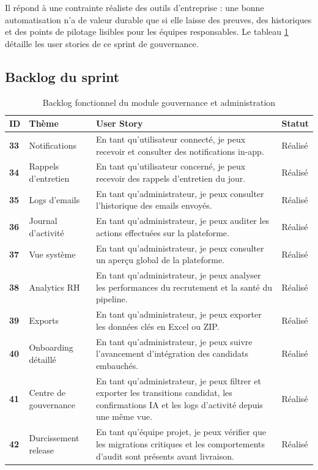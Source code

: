 Il répond à une contrainte réaliste des outils d'entreprise : une bonne automatisation n'a de valeur durable que si elle laisse des preuves, des historiques et des points de pilotage lisibles pour les équipes responsables.
Le tableau \ref{tab:governance-backlog} détaille les user stories de ce sprint de gouvernance.

\subsection{Backlog du sprint}
\begin{table}[H]
  \centering
  \caption{\label{tab:governance-backlog}Backlog fonctionnel du module gouvernance et administration}
  \begin{tabularx}{\textwidth}{>{\bfseries}p{1.3cm}p{3cm}X>{\raggedright\arraybackslash}p{2cm}}
    \toprule
    ID & Thème & User Story & Statut \\
    \midrule
    33 & Notifications & En tant qu'utilisateur connecté, je peux recevoir et consulter des notifications in-app. & Réalisé \\
    34 & Rappels d'entretien & En tant qu'utilisateur concerné, je peux recevoir des rappels d'entretien du jour. & Réalisé \\
    35 & Logs d'emails & En tant qu'administrateur, je peux consulter l'historique des emails envoyés. & Réalisé \\
    36 & Journal d'activité & En tant qu'administrateur, je peux auditer les actions effectuées sur la plateforme. & Réalisé \\
    37 & Vue système & En tant qu'administrateur, je peux consulter un aperçu global de la plateforme. & Réalisé \\
    38 & Analytics RH & En tant qu'administrateur, je peux analyser les performances du recrutement et la santé du pipeline. & Réalisé \\
    39 & Exports & En tant qu'administrateur, je peux exporter les données clés en Excel ou ZIP. & Réalisé \\
    40 & Onboarding détaillé & En tant qu'administrateur, je peux suivre l'avancement d'intégration des candidats embauchés. & Réalisé \\
    41 & Centre de gouvernance & En tant qu'administrateur, je peux filtrer et exporter les transitions candidat, les confirmations IA et les logs d'activité depuis une même vue. & Réalisé \\
    42 & Durcissement release & En tant qu'équipe projet, je peux vérifier que les migrations critiques et les comportements d'audit sont présents avant livraison. & Réalisé \\

\end{tabularx}
\end{table}
